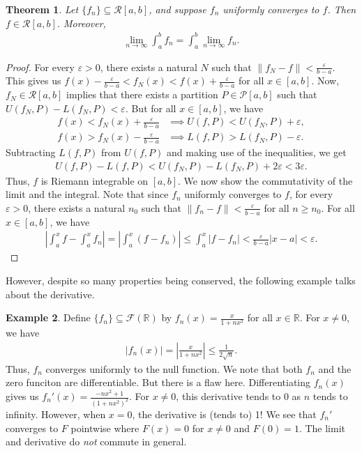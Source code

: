 \documentclass[15pt,a4paper]{book}
\newtheorem{theorem}{Theorem}[chapter]
\theoremstyle{definition}
\newtheorem{example}[theorem]{Example}
\newcommand{\abs}[1]{\left| #1 \right|} %
\newcommand{\R}{\mathbb{R}} %
\newcommand{\cP}{\mathcal{P}}
\newcommand{\cR}{\mathcal{R}}
\newcommand{\cF}{\mathcal{F}}
\newcommand{\norm}[1]{\left\lVert#1\right\rVert}
\begin{document}
\begin{theorem}
    Let $\{f_{n}\} \subseteq \cR[a,b]$, and suppose $f_{n}$ uniformly converges to $f$. Then $f \in \cR[a,b]$. Moreover,
    \begin{align*}
        \lim_{n \to \infty} \int_{a}^{b} f_{n} = \int_{a}^{b} \lim_{n \to \infty} f_{n}.
    \end{align*}
\end{theorem}
\begin{proof}
    For every $\varepsilon > 0$, there exists a natural $N$ such that $\norm{f_{N}-f} < \frac{\varepsilon}{b-a}$. This gives us $f(x) - \frac{\varepsilon}{b-a} < f_{N}(x) < f(x) + \frac{\varepsilon}{b-a}$ for all $x \in [a,b]$. Now, $f_{N} \in \cR[a,b]$ implies that there exists a partition $P \in \cP[a,b]$ such that $U(f_{N},P)-L(f_{N},P) < \varepsilon$. But for all $x \in [a,b]$, we have
    \begin{align}
        f(x) < f_{N}(x) + \frac{\varepsilon}{b-a} &\implies U(f,P) < U(f_{N},P) + \varepsilon,\\
        f(x) > f_{N}(x) - \frac{\varepsilon}{b-a} &\implies L(f,P) > L(f_{N},P) - \varepsilon.
    \end{align}
    Subtracting $L(f,P)$ from $U(f,P)$ and making use of the inequalities, we get
    \begin{align}
        U(f,P) - L(f,P) < U(f_{N},P) - L(f_{N},P) + 2\varepsilon < 3\varepsilon.
    \end{align}
    Thus, $f$ is Riemann integrable on $[a,b]$. We now show the commutativity of the limit and the integral. Note that since $f_{n}$ uniformly converges to $f$, for every $\varepsilon > 0$, there exists a natural $n_{0}$ such that $\norm{f_{n}-f} < \frac{\varepsilon}{b-a}$ for all $n \geq n_{0}$. For all $x \in [a,b]$, we have
    \begin{align}
        \abs{\int_{a}^{x}f-\int_{a}^{x}f_{n}} = \abs{\int_{a}^{x}(f-f_{n})} \leq \int_{a}^{x} \abs{f-f_{n}} < \frac{\varepsilon}{b-a}\abs{x-a} < \varepsilon.
    \end{align}
\end{proof}

However, despite so many properties being conserved, the following example talks about the derivative.

\begin{example}
    Define $\{f_{n}\} \subseteq \cF(\R)$ by $f_{n}(x) = \frac{x}{1+nx^{2}}$ for all $x \in \R$. For $x \neq 0$, we have
    \begin{align}
        \abs{f_{n}(x)} = \abs{\frac{x}{1+nx^{2}}} \leq \frac{1}{2\sqrt{n}}.
    \end{align}
    Thus, $f_{n}$ converges uniformly to the null function. We note that both $f_{n}$ and the zero funciton are differentiable. But there is a flaw here. Differentiating $f_{n}(x)$ gives us $f_{n}'(x) = \frac{-nx^{2}+1}{(1+nx^{2})^{2}}$. For $x \neq 0$, this derivative tends to 0 as $n$ tends to infinity. However, when $x = 0$, the derivative is (tends to) 1! We see that $f_{n}'$ converges to $F$ pointwise where $F(x) = 0$ for $x \neq 0$ and $F(0) = 1$. The limit and derivative do \textit{not} commute in general.
\end{example}
\end{document}
